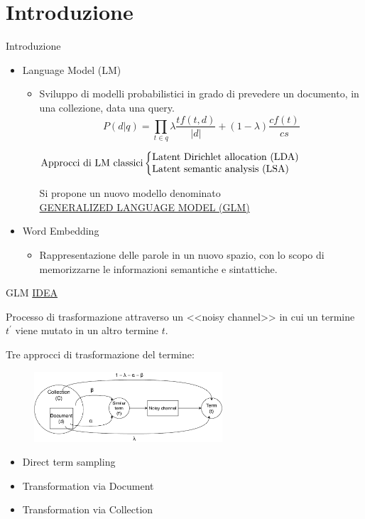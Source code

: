\section{Introduzione}
\begin{frame}{Introduzione}
    \begin{itemize}
        \item Language Model (LM)
              \begin{itemize}
                  \item Sviluppo di modelli probabilistici in grado di prevedere un documento, in una collezione, data una query.
                        \[P(d|q) = \prod_{t\in q}^{ } \lambda \frac{tf(t,d)}{|d|} + (1 - \lambda) \frac{cf(t)}{cs}\]

                        \(
                        \text{Approcci di LM classici} \left\lbrace\parbox{7cm}{Latent Dirichlet allocation (LDA) \\ Latent semantic analysis (LSA)}\right.
                        \)

                        \begin{center}
                            Si propone un nuovo modello denominato\\ \underline{GENERALIZED LANGUAGE MODEL (GLM)}
                        \end{center}
              \end{itemize}
        \item Word Embedding
              \begin{itemize}
                  \item Rappresentazione delle parole in un nuovo spazio, con lo scopo di memorizzarne le informazioni semantiche e sintattiche.
              \end{itemize}
    \end{itemize}
\end{frame}

\begin{frame}{GLM}
    \underline{IDEA}

    Processo di trasformazione attraverso un <<noisy channel>> in cui un termine \(t^{'}\) viene mutato in un altro termine \(t\).

    \bigskip
    Tre approcci di trasformazione del termine:
    \begin{figure}
        \centering
        \includegraphics[width=7cm]{img/glm.pdf}
    \end{figure}
    \begin{itemize}
        \item Direct term sampling
        \item Transformation via Document
        \item Transformation via Collection
    \end{itemize}
\end{frame}

